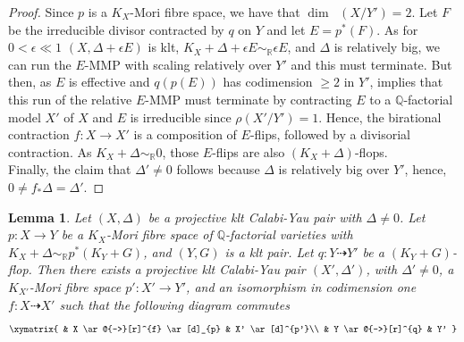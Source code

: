 \documentclass{amsart}[12pt,a4paper]
\newtheorem{lemma}[theorem]{Lemma}
\theoremstyle{definition}
\DeclareMathOperator{\NS}{N^1}
\begin{document}
\begin{proof}
Since $p$ is a $K_X$-Mori fibre space, we have that $\dim \NS(X/Y')=2$. 
Let $F$ be the irreducible divisor contracted by $q$ on $Y$ and let $E=p^\ast(F)$.
As for $0<\epsilon\ll 1$ $(X, \Delta+\epsilon E)$ is klt, $K_X+\Delta + \epsilon E\sim_\mathbb{R} \epsilon E$, and $\Delta$ is relatively big, we can run the $E$-MMP with scaling relatively over $Y'$ and this must terminate.
But then, as $E$ is effective and $q(p(E))$ has codimension $\geq 2$ in $Y'$, \cite[Lemma 2.10]{Lai} implies that this run of the relative $E$-MMP must terminate by contracting $E$ to a $\mathbb{Q}$-factorial model $X'$ of $X$ and $E$ is irreducible since $\rho(X'/Y')=1$.
Hence, the birational contraction $f \colon X \to X'$ is a composition of $E$-flips, followed by a divisorial contraction.
As $K_X+\Delta \sim_\mathbb{R} 0$, those $E$-flips are also $(K_X+\Delta)$-flops.
\\
Finally, the claim that $\Delta' \neq 0$ follows because $\Delta$ is relatively big over $Y'$, hence, $0\neq f_\ast \Delta =\Delta'$.
\end{proof}

\begin{lemma}
\label{flip.step}
Let $(X,\Delta)$ be a projective klt Calabi-Yau pair with $\Delta\neq 0$.  
Let $p \colon X\rightarrow Y$ be a $K_X$-Mori fibre space of $\mathbb{Q}$-factorial varieties with $K_X+\Delta \sim_{\mathbb{R}} p^\ast(K_Y+G)$, and $(Y, G)$ is a klt pair.
Let $q \colon Y \dashrightarrow Y'$ be a $(K_Y+G)$-flop. 
Then there exists a projective klt Calabi-Yau pair $(X',\Delta')$, with $\Delta'\neq 0$, a $K_{X'}$-Mori fibre space $p' : X'\rightarrow Y'$, and an isomorphism in codimension one $f\colon X\dashrightarrow X'$ such that the following diagram commutes
\begin{displaymath}
	\xymatrix{
		& X \ar@{-->}[r]^{f} \ar[d]_{p} &  X' \ar[d]^{p'}\\
		& Y \ar@{-->}[r]^{q}  &  Y'	
	}
\end{displaymath}
\end{lemma}
\end{document}
